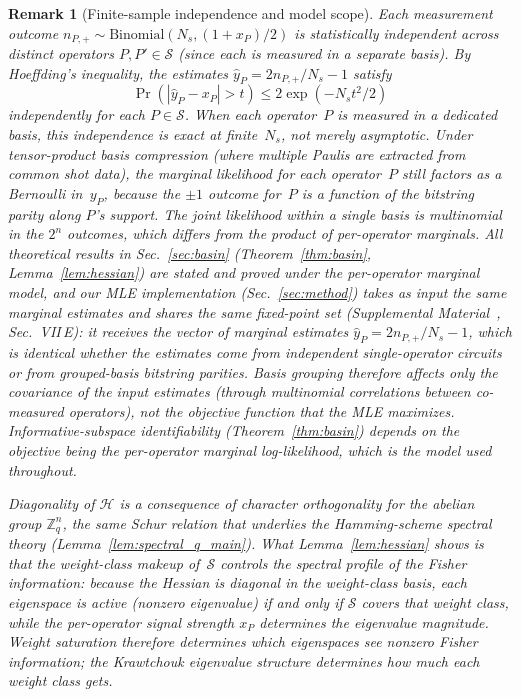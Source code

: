 \documentclass[twocolumn,prx,aps,superscriptaddress,longbibliography,floatfix]{revtex4-2}
\newtheorem*{remark}{Remark}
\begin{document}
\begin{remark}[Finite-sample independence and model scope]
Each measurement outcome $n_{P,+} \sim
\mathrm{Binomial}(N_s, (1{+}x_P)/2)$ is statistically
independent across distinct operators $P, P' \in \mathcal{S}$
(since each is measured in a separate basis).
By Hoeffding's inequality, the estimates
$\hat{y}_P = 2n_{P,+}/N_s - 1$ satisfy
\begin{equation}\label{eq:hoeffding}
  \Pr(|\hat{y}_P - x_P| > t) \le 2\exp(-N_s t^2/2)
\end{equation}
independently for each $P \in \mathcal{S}$.
When each operator~$P$ is measured in a dedicated basis,
this independence is \emph{exact} at finite~$N_s$,
not merely asymptotic.
Under tensor-product basis compression (where multiple
Paulis are extracted from common shot data), the
\emph{marginal} likelihood for each operator~$P$ still
factors as a Bernoulli in~$y_P$, because the $\pm 1$
outcome for~$P$ is a function of the bitstring parity
along $P$'s support.
The \emph{joint} likelihood within a single basis is
multinomial in the $2^n$ outcomes, which differs from
the product of per-operator marginals.
All theoretical results in Sec.~\ref{sec:basin}
(Theorem~\ref{thm:basin}, Lemma~\ref{lem:hessian})
are stated and proved under the per-operator marginal
model, and our MLE implementation (Sec.~\ref{sec:method})
takes as input the same marginal estimates and shares the
same fixed-point set (Supplemental
Material~\cite{supplemental}, Sec.~VII\,E): it receives
the vector of marginal estimates
$\hat{y}_P = 2n_{P,+}/N_s - 1$, which is identical
whether the estimates come from independent
single-operator circuits or from grouped-basis bitstring
parities.
Basis grouping therefore affects only the covariance
of the input estimates (through multinomial correlations
between co-measured operators), not the objective function
that the MLE maximizes.
Informative-subspace identifiability
(Theorem~\ref{thm:basin}) depends on the objective
being the per-operator marginal log-likelihood, which
is the model used throughout.

Diagonality of $\mathcal{H}$ is a consequence of
character orthogonality for the abelian group
$\mathbb{Z}_q^n$, the same Schur relation that underlies the
Hamming-scheme spectral theory
(Lemma~\ref{lem:spectral_q_main}).
What Lemma~\ref{lem:hessian} shows is that the weight-class
makeup of~$\mathcal{S}$ controls the spectral profile of the Fisher
information: because the Hessian is diagonal in the weight-class
basis, each eigenspace is active (nonzero eigenvalue) if and only
if $\mathcal{S}$ covers that weight class, while the per-operator
signal strength $x_P$ determines the eigenvalue magnitude.
Weight saturation therefore determines \emph{which} eigenspaces
see nonzero Fisher information; the Krawtchouk eigenvalue structure
determines \emph{how much} each weight class gets.
\end{remark}
\end{document}
